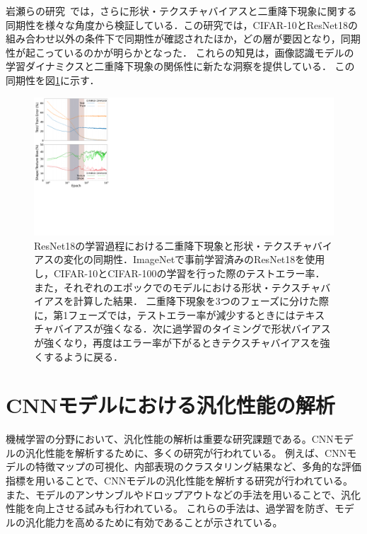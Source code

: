 岩瀬らの研究~\cite{icpr2024iwase}では，さらに形状・テクスチャバイアスと二重降下現象に関する同期性を様々な角度から検証している．この研究では，CIFAR-10とResNet18の組み合わせ以外の条件下で同期性が確認されたほか，どの層が要因となり，同期性が起こっているのかが明らかとなった．
これらの知見は，画像認識モデルの学習ダイナミクスと二重降下現象の関係性に新たな洞察を提供している．
この同期性を図\ref{fig:iwaseICPR}に示す．

\begin{figure}[tb]
    \centering
    \includegraphics[width=\linewidth]{fig/iwaseICPR.pdf}
    \caption[ResNet18の学習過程における二重降下現象と形状・テクスチャバイアスの変化の同期性．]{ResNet18の学習過程における二重降下現象と形状・テクスチャバイアスの変化の同期性．ImageNetで事前学習済みのResNet18を使用し，CIFAR-10とCIFAR-100の学習を行った際のテストエラー率．また，それぞれのエポックでのモデルにおける形状・テクスチャバイアスを計算した結果．
    二重降下現象を3つのフェーズに分けた際に，第1フェーズでは，テストエラー率が減少するときにはテキスチャバイアスが強くなる．次に過学習のタイミングで形状バイアスが強くなり，再度はエラー率が下がるときテクスチャバイアスを強くするように戻る．}
    \label{fig:iwaseICPR}
\end{figure}

\section{CNNモデルにおける汎化性能の解析}
機械学習の分野において、汎化性能の解析は重要な研究課題である。CNNモデルの汎化性能を解析するために、多くの研究が行われている。
例えば、CNNモデルの特徴マップの可視化\cite{DBLP:conf/cvpr/ZeilerF14}、内部表現のクラスタリング結果など、多角的な評価指標を用いることで、CNNモデルの汎化性能を解析する研究が行われている。
また、モデルのアンサンブルやドロップアウトなどの手法を用いることで、汎化性能を向上させる試みも行われている\cite{JMLR:v15:srivastava14a}。
これらの手法は、過学習を防ぎ、モデルの汎化能力を高めるために有効であることが示されている。
